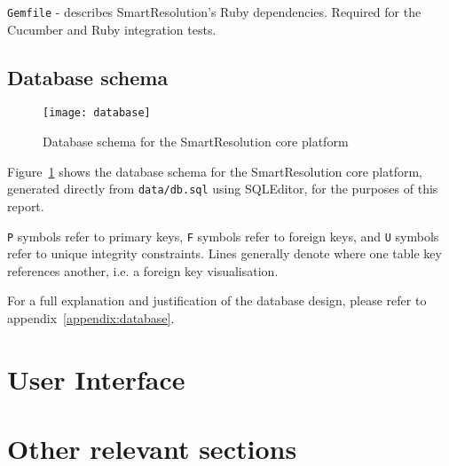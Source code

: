 \lstinline{Gemfile} - describes SmartResolution's Ruby dependencies. Required for the Cucumber and Ruby integration tests.

\subsection{Database schema}

\begin{figure}[h!]
  \centering
    \texttt{[image: database]}
  \caption{Database schema for the SmartResolution core platform}
  \label{uml:databaseSchema}
\end{figure}

Figure~\ref{uml:databaseSchema} shows the database schema for the SmartResolution core platform, generated directly from \lstinline{data/db.sql} using SQLEditor, for the purposes of this report.

\lstinline{P} symbols refer to primary keys, \lstinline{F} symbols refer to foreign keys, and \lstinline{U} symbols refer to unique integrity constraints. Lines generally denote where one table key references another, i.e. a foreign key visualisation.

For a full explanation and justification of the database design, please refer to appendix~\ref{appendix:database}.

\section{User Interface}

\section{Other relevant sections}
